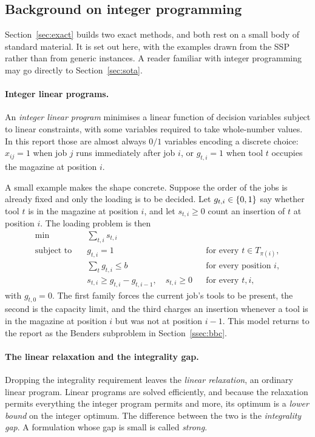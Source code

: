\subsection{Background on integer programming}\label{ssec:toolkit}

Section~\ref{sec:exact} builds two exact methods, and both rest on a small body of
standard material. It is set out here, with the examples drawn from the
SSP rather than from generic instances. A reader familiar with integer programming
may go directly to Section~\ref{sec:sota}.

\paragraph{Integer linear programs.}
An \emph{integer linear program} minimises a linear function of decision variables
subject to linear constraints, with some variables required to take whole-number
values. In this report those are almost always $0/1$ variables encoding a discrete
choice: $x_{ij}=1$ when job $j$ runs immediately after job $i$, or $g_{t,i}=1$ when
tool $t$ occupies the magazine at position $i$.

A small example makes the shape concrete. Suppose the order of the jobs is already
fixed and only the loading is to be decided. Let $g_{t,i}\in\{0,1\}$ say whether
tool $t$ is in the magazine at position $i$, and let $s_{t,i}\ge0$ count an insertion
of $t$ at position $i$. The loading problem is then
\[
\begin{aligned}
  \min\quad & \sum_{t,i}s_{t,i}\\
  \text{subject to}\quad
  & g_{t,i}=1 && \text{for every } t\in T_{\pi(i)},\\
  & \textstyle\sum_{t}g_{t,i}\le b && \text{for every position } i,\\
  & s_{t,i}\ge g_{t,i}-g_{t,i-1},\quad s_{t,i}\ge0 && \text{for every } t,i,
\end{aligned}
\]
with $g_{t,0}=0$. The first family forces the current job's tools to be present, the
second is the capacity limit, and the third charges an insertion whenever a tool is
in the magazine at position $i$ but was not at position $i-1$. This model returns to
the report as the Benders subproblem in Section~\ref{ssec:bbc}.

\paragraph{The linear relaxation and the integrality gap.}
Dropping the integrality requirement leaves the \emph{linear relaxation}, an
ordinary linear program. Linear programs are solved efficiently, and because the
relaxation permits everything the integer program permits and more, its optimum is a
\emph{lower bound} on the integer optimum. The difference between the two is the
\emph{integrality gap}. A formulation whose gap is small is called \emph{strong}.


